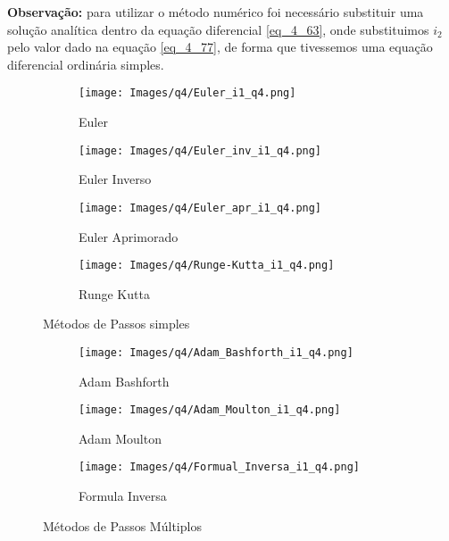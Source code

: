 \documentclass[12pt]{article}
\begin{document}
\newline

\textbf{Observação:} para utilizar o método numérico foi necessário substituir uma solução analítica dentro da equação diferencial \ref{eq_4_63}, onde substituimos $i_2$ pelo valor dado na equação \ref{eq_4_77}, de forma que tivessemos uma equação diferencial ordinária simples. 

\begin{figure}[H]
\begin{subfigure}{.5\textwidth}
  \centering
  \texttt{[image: Images/q4/Euler\_i1\_q4.png]}  
  \caption{Euler}
\end{subfigure}
\begin{subfigure}{.5\textwidth}
  \centering
  \texttt{[image: Images/q4/Euler\_inv\_i1\_q4.png]}  
  \caption{Euler Inverso}
\end{subfigure}

\newline

\begin{subfigure}{.5\textwidth}
  \centering
  \texttt{[image: Images/q4/Euler\_apr\_i1\_q4.png]}  
  \caption{Euler Aprimorado}
\end{subfigure}
\begin{subfigure}{.5\textwidth}
  \centering
  \texttt{[image: Images/q4/Runge-Kutta\_i1\_q4.png]}  
  \caption{Runge Kutta}
\end{subfigure}
\caption{Métodos de Passos simples}
\end{figure}

\begin{figure}[H]
\begin{subfigure}{.5\textwidth}
  \centering
  \texttt{[image: Images/q4/Adam\_Bashforth\_i1\_q4.png]}  
  \caption{Adam Bashforth}
\end{subfigure}
\begin{subfigure}{.5\textwidth}
  \centering
  \texttt{[image: Images/q4/Adam\_Moulton\_i1\_q4.png]}  
  \caption{Adam Moulton}
\end{subfigure}

\newline

\begin{subfigure}{.5\textwidth}
  \centering
  \texttt{[image: Images/q4/Formual\_Inversa\_i1\_q4.png]}  
  \caption{Formula Inversa}
\end{subfigure}
\caption{Métodos de Passos Múltiplos}
\end{figure}
\end{document}
